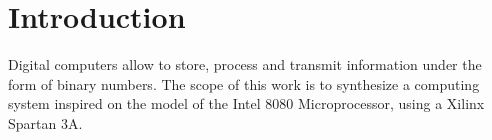 \section{Introduction} \label{sec:intro}
Digital computers allow to store, process and transmit information under the form of binary numbers.
The scope of this work is to synthesize a computing system inspired on the model of the Intel 8080 Microprocessor, using a Xilinx Spartan 3A.